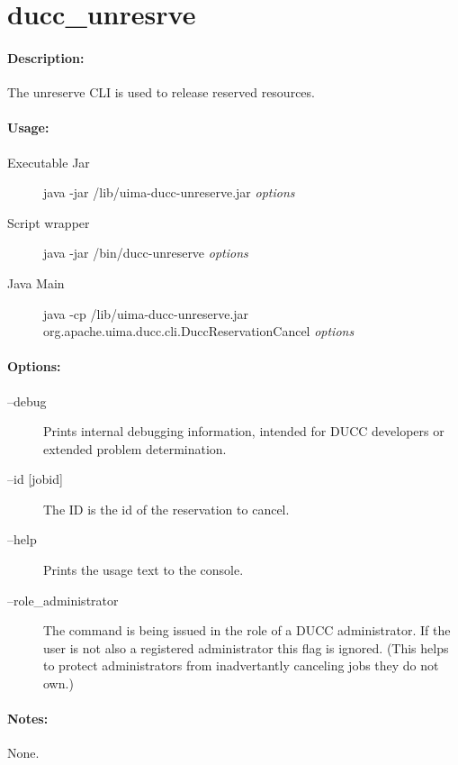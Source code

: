 \ifpdf
\else
{}
\fi
    \section{ducc\_unresrve}

    \paragraph{Description:}
    The unreserve CLI is used to release reserved resources. 

    \paragraph{Usage:}
    \begin{description}
    \item[Executable Jar] java -jar \ducchome/lib/uima-ducc-unreserve.jar {\em options}
    \item[Script wrapper] java -jar \ducchome/bin/ducc-unreserve {\em options}
    \item[Java Main]      java -cp \ducchome/lib/uima-ducc-unreserve.jar org.apache.uima.ducc.cli.DuccReservationCancel {\em options}
    \end{description}

    \paragraph{Options:}
    \begin{description}
        \item[--debug ]          
          Prints internal debugging information, intended for DUCC developers or extended problem determination.
        \item[--id {[jobid]}]
          The ID is the id of the reservation to cancel.
        \item[--help]
          Prints the usage text to the console. 
        \item[--role\_administrator] The command is being issued in the role of a DUCC administrator.
          If the user is not also a registered administrator this flag is ignored.  (This helps to
          protect administrators from inadvertantly canceling jobs they do not own.)          
     \end{description}
        
    \paragraph{Notes:}
    None.

